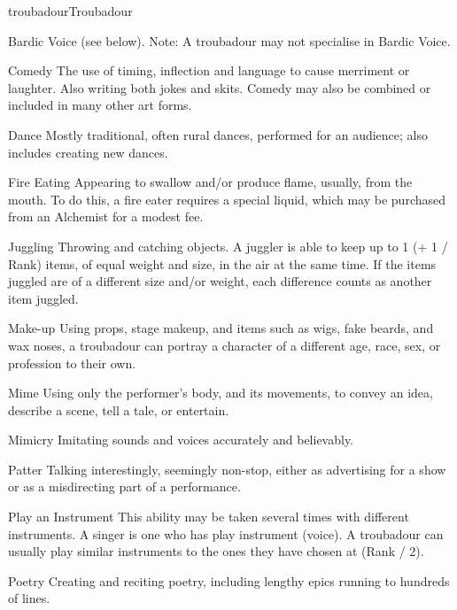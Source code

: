 \begin{Skill}[2.1]{troubadour}{Troubadour}
\begin{Description}
\item[Bardic Voice] (see below).  Note: A troubadour may not
  specialise in Bardic Voice.

\item[Comedy] The use of timing, inflection and language to cause
  merriment or laughter. Also writing both jokes and skits.  Comedy
  may also be combined or included in many other art forms.

\item[Dance] Mostly traditional, often rural dances, performed for an
  audience; also includes creating new dances.

\item[Fire Eating] Appearing to swallow and/or produce flame, usually,
  from the mouth.  To do this, a fire eater requires a special liquid,
  which may be purchased from an Alchemist for a modest fee.

\item[Juggling] Throwing and catching objects. A juggler is able to
  keep up to 1 (+ 1 / Rank) items, of equal weight and size, in the
  air at the same time.  If the items juggled are of a different size
  and/or weight, each difference counts as another item juggled.

\item[Make-up] Using props, stage makeup, and items such as wigs, fake
  beards, and wax noses, a troubadour can portray a character of a
  different age, race, sex, or profession to their own.

\item[Mime] Using only the performer’s body, and its movements, to
  convey an idea, describe a scene, tell a tale, or entertain.

\item[Mimicry] Imitating sounds and voices accurately and believably.

\item[Patter] Talking interestingly, seemingly non-stop, either as
  advertising for a show or as a misdirecting part of a performance.

\item[Play an Instrument] This ability may be taken several times with
  different instruments.  A singer is one who has play instrument
  (voice).  A troubadour can usually play similar instruments to the
  ones they have chosen at (Rank / 2).

\item[Poetry] Creating and reciting poetry, including lengthy epics
  running to hundreds of lines.


\end{Description}
\end{Skill}

